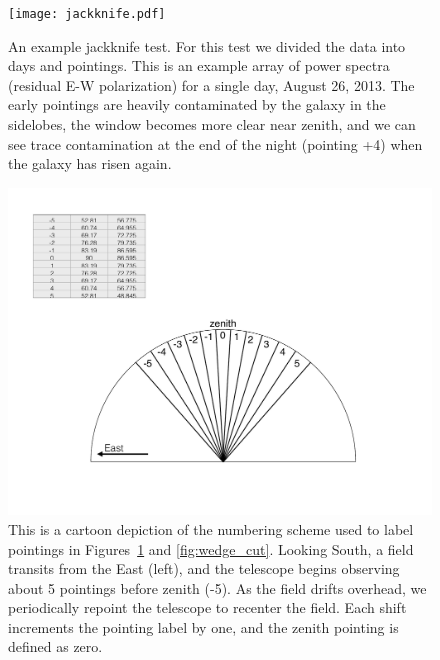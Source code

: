 \documentclass[iop]{emulateapj}
\begin{document}
\begin{figure}
\begin{center}
\texttt{[image: jackknife.pdf]}
\caption[Per pointing jackknife]{An example jackknife test. For this test we divided the data 
into days and pointings. This is an example array of power spectra (residual E-W 
polarization) for a single day, August 26, 2013. The early pointings are heavily contaminated 
by the galaxy in the sidelobes, the window becomes more clear near zenith, and we can 
see trace contamination at the end of the night (pointing +4) when the galaxy has risen 
again.
\label{fig:jackknife}
}
\end{center}
\end{figure}

\begin{figure}
\begin{center}
\includegraphics[width=\columnwidth]{pointing_cartoon.pdf}
\caption{This is a cartoon depiction of the numbering scheme used to label pointings in
Figures~\ref{fig:jackknife} and \ref{fig:wedge_cut}. Looking South, a field transits from the
East (left), and the telescope begins observing about 5 pointings before zenith (-5). As the
field drifts overhead, we periodically repoint the telescope to recenter the field. Each shift
increments the pointing label by one, and the zenith pointing is defined as zero.
\label{fig:pointing}
}
\end{center}
\end{figure}
\end{document}
